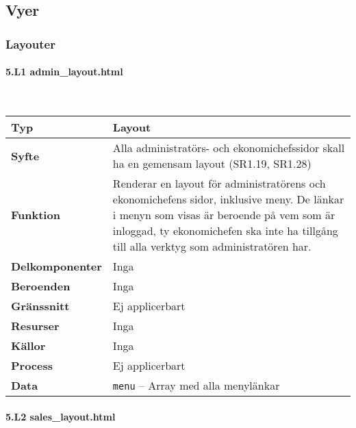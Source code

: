 \documentclass[a4paper, twoside, 11pt, titlepage]{article}
\begin{document}
	\clearpage %
	\subsection{Vyer}



		\subsubsection{Layouter}



			\paragraph{5.L1 admin\_layout.html}\

			\begin {table} [ht] \begin{tabular} {  p{3.5cm} p{11.6cm} }
				\hline
				{\sffamily\textbf{Typ}} & {Layout} \\
				\hline
				{\sffamily\textbf{Syfte}} & {Alla administratörs- och ekonomichefssidor skall ha en gemensam layout (SR1.19, SR1.28)} \\
				\hline
				{\sffamily\textbf{Funktion}} & {Renderar en layout för administratörens och ekonomichefens sidor, inklusive meny. De länkar i menyn som visas är beroende på vem som är inloggad, ty ekonomichefen ska inte ha tillgång till alla verktyg som administratören har.} \\
				\hline
				{\sffamily\textbf{Delkomponenter}} & {Inga} \\
				\hline
				{\sffamily\textbf{Beroenden}} & {Inga} \\
				\hline
				{\sffamily\textbf{Gränssnitt}} & {Ej applicerbart} \\
				\hline
				{\sffamily\textbf{Resurser}} & {Inga} \\
				\hline
				{\sffamily\textbf{Källor}} & {Inga} \\
				\hline
				{\sffamily\textbf{Process}} & {Ej applicerbart} \\
				\hline
				{\sffamily\textbf{Data}} & {{\tt menu} – Array med alla menylänkar} \\
				\hline
			\end{tabular} \end{table} \FloatBarrier


			\paragraph{5.L2 sales\_layout.html}\
\end{document}
